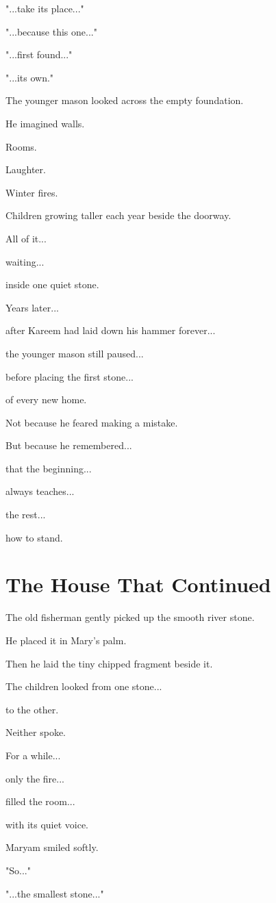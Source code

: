 \documentclass[12pt,openany]{book}
\begin{document}
"...take its place..."

"...because this one..."

"...first found..."

"...its own."

The younger mason looked across the empty foundation.

He imagined walls.

Rooms.

Laughter.

Winter fires.

Children growing taller each year beside the doorway.

All of it...

waiting...

inside one quiet stone.

Years later...

after Kareem had laid down his hammer forever...

the younger mason still paused...

before placing the first stone...

of every new home.

Not because he feared making a mistake.

But because he remembered...

that the beginning...

always teaches...

the rest...

how to stand.
\section*{The House That Continued}

The old fisherman gently picked up the smooth river stone.

He placed it in Mary's palm.

Then he laid the tiny chipped fragment beside it.

The children looked from one stone...

to the other.

Neither spoke.

For a while...

only the fire...

filled the room...

with its quiet voice.

Maryam smiled softly.

"So..."

"...the smallest stone..."
\end{document}
